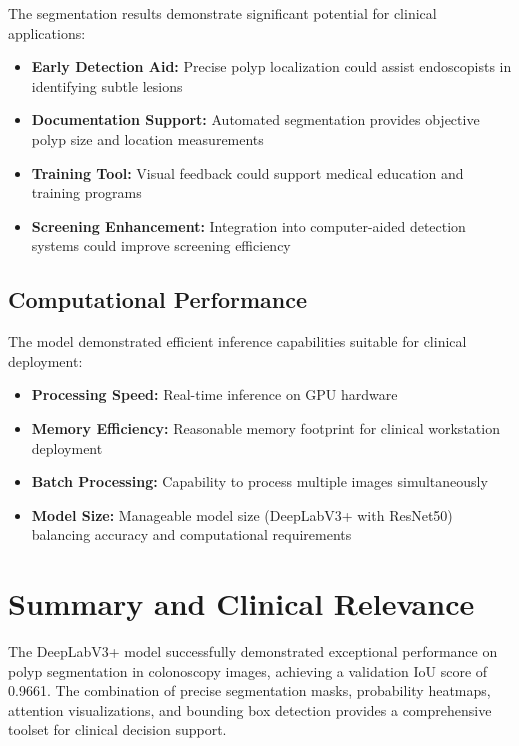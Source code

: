\documentclass[a4paper,12pt]{report}
\begin{document}
The segmentation results demonstrate significant potential for clinical applications:

\begin{itemize}
    \item \textbf{Early Detection Aid:} Precise polyp localization could assist endoscopists in identifying subtle lesions
    \item \textbf{Documentation Support:} Automated segmentation provides objective polyp size and location measurements
    \item \textbf{Training Tool:} Visual feedback could support medical education and training programs
    \item \textbf{Screening Enhancement:} Integration into computer-aided detection systems could improve screening efficiency
\end{itemize}

\subsection{Computational Performance}

The model demonstrated efficient inference capabilities suitable for clinical deployment:

\begin{itemize}
    \item \textbf{Processing Speed:} Real-time inference on GPU hardware
    \item \textbf{Memory Efficiency:} Reasonable memory footprint for clinical workstation deployment
    \item \textbf{Batch Processing:} Capability to process multiple images simultaneously
    \item \textbf{Model Size:} Manageable model size (DeepLabV3+ with ResNet50) balancing accuracy and computational requirements
\end{itemize}

\section{Summary and Clinical Relevance}

The DeepLabV3+ model successfully demonstrated exceptional performance on polyp segmentation in colonoscopy images, achieving a validation IoU score of 0.9661. The combination of precise segmentation masks, probability heatmaps, attention visualizations, and bounding box detection provides a comprehensive toolset for clinical decision support.
\end{document}

